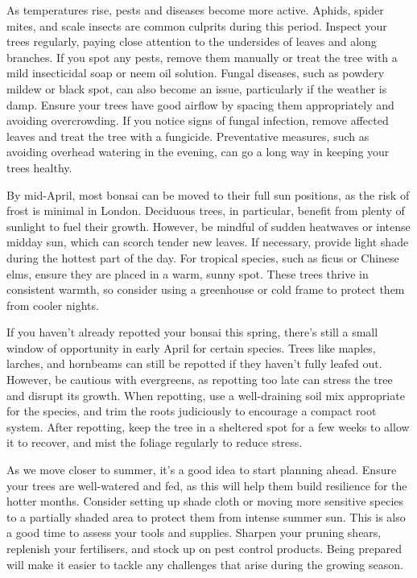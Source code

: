 {}
\noindent
As temperatures rise, pests and diseases become more active.
Aphids, spider mites, and scale insects are common culprits during this period.
Inspect your trees regularly, paying close attention to the undersides of leaves and along branches.
If you spot any pests, remove them manually or treat the tree with a mild insecticidal soap or neem oil solution.
%
Fungal diseases, such as powdery mildew or black spot, can also become an issue, particularly if the weather is damp.
Ensure your trees have good airflow by spacing them appropriately and avoiding overcrowding.
If you notice signs of fungal infection, remove affected leaves and treat the tree with a fungicide.
Preventative measures, such as avoiding overhead watering in the evening, can go a long way in keeping your trees healthy.

{}
\noindent
By mid\--April, most bonsai can be moved to their full sun positions, as the risk of frost is minimal in London.
Deciduous trees, in particular, benefit from plenty of sunlight to fuel their growth.
However, be mindful of sudden heatwaves or intense midday sun, which can scorch tender new leaves.
If necessary, provide light shade during the hottest part of the day.
%
For tropical species, such as ficus or Chinese elms, ensure they are placed in a warm, sunny spot.
These trees thrive in consistent warmth, so consider using a greenhouse or cold frame to protect them from cooler nights.

{}
\noindent
If you haven't already repotted your bonsai this spring, there's still a small window of opportunity in early April for certain species.
Trees like maples, larches, and hornbeams can still be repotted if they haven't fully leafed out.
However, be cautious with evergreens, as repotting too late can stress the tree and disrupt its growth.
%
When repotting, use a well\--draining soil mix appropriate for the species, and trim the roots judiciously to encourage a compact root system.
After repotting, keep the tree in a sheltered spot for a few weeks to allow it to recover, and mist the foliage regularly to reduce stress.

{}
\noindent
As we move closer to summer, it's a good idea to start planning ahead.
Ensure your trees are well\--watered and fed, as this will help them build resilience for the hotter months.
Consider setting up shade cloth or moving more sensitive species to a partially shaded area to protect them from intense summer sun.
%
This is also a good time to assess your tools and supplies.
Sharpen your pruning shears, replenish your fertilisers, and stock up on pest control products.
Being prepared will make it easier to tackle any challenges that arise during the growing season.

